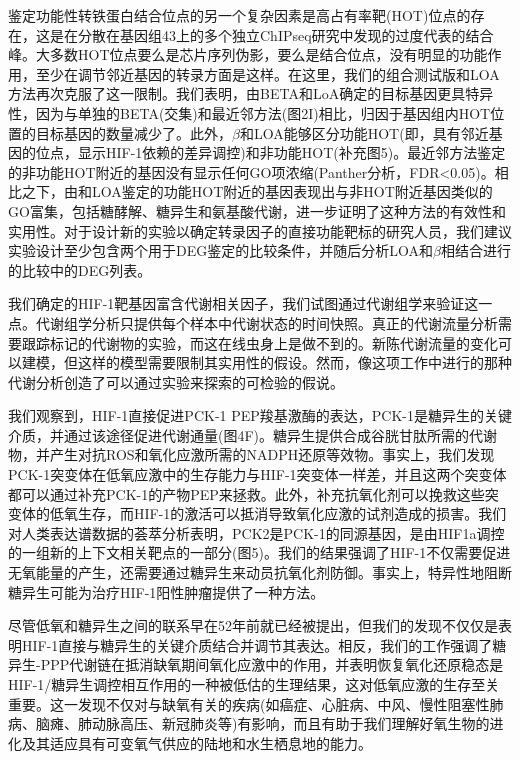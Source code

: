 \documentclass{ctexart}
\begin{document}
        鉴定功能性转铁蛋白结合位点的另一个复杂因素是高占有率靶(HOT)位点的存在，这是在分散在基因组43上的多个独立ChIPseq研究中发现的过度代表的结合峰。大多数HOT位点要么是芯片序列伪影，要么是结合位点，没有明显的功能作用，至少在调节邻近基因的转录方面是这样。在这里，我们的组合测试版和LOA方法再次克服了这一限制。我们表明，由BETA和LoA确定的目标基因更具特异性，因为与单独的BETA(交集)和最近邻方法(图2I)相比，归因于基因组内HOT位置的目标基因的数量减少了。此外，$\beta$和LOA能够区分功能HOT(即，具有邻近基因的位点，显示HIF-1依赖的差异调控)和非功能HOT(补充图5)。最近邻方法鉴定的非功能HOT附近的基因没有显示任何GO项浓缩(Panther分析，FDR<0.05)。相比之下，由和LOA鉴定的功能HOT附近的基因表现出与非HOT附近基因类似的GO富集，包括糖酵解、糖异生和氨基酸代谢，进一步证明了这种方法的有效性和实用性。对于设计新的实验以确定转录因子的直接功能靶标的研究人员，我们建议实验设计至少包含两个用于DEG鉴定的比较条件，并随后分析LOA和$\beta$相结合进行的比较中的DEG列表。

        我们确定的HIF-1靶基因富含代谢相关因子，我们试图通过代谢组学来验证这一点。代谢组学分析只提供每个样本中代谢状态的时间快照。真正的代谢流量分析需要跟踪标记的代谢物的实验，而这在线虫身上是做不到的。新陈代谢流量的变化可以建模，但这样的模型需要限制其实用性的假设。然而，像这项工作中进行的那种代谢分析创造了可以通过实验来探索的可检验的假说。

        我们观察到，HIF-1直接促进PCK-1 PEP羧基激酶的表达，PCK-1是糖异生的关键介质，并通过该途径促进代谢通量(图4F)。糖异生提供合成谷胱甘肽所需的代谢物，并产生对抗ROS和氧化应激所需的NADPH还原等效物。事实上，我们发现PCK-1突变体在低氧应激中的生存能力与HIF-1突变体一样差，并且这两个突变体都可以通过补充PCK-1的产物PEP来拯救。此外，补充抗氧化剂可以挽救这些突变体的低氧生存，而HIF-1的激活可以抵消导致氧化应激的试剂造成的损害。我们对人类表达谱数据的荟萃分析表明，PCK2是PCK-1的同源基因，是由HIF1a调控的一组新的上下文相关靶点的一部分(图5)。我们的结果强调了HIF-1不仅需要促进无氧能量的产生，还需要通过糖异生来动员抗氧化剂防御。事实上，特异性地阻断糖异生可能为治疗HIF-1阳性肿瘤提供了一种方法。

        尽管低氧和糖异生之间的联系早在52年前就已经被提出，但我们的发现不仅仅是表明HIF-1直接与糖异生的关键介质结合并调节其表达。相反，我们的工作强调了糖异生-PPP代谢链在抵消缺氧期间氧化应激中的作用，并表明恢复氧化还原稳态是HIF-1/糖异生调控相互作用的一种被低估的生理结果，这对低氧应激的生存至关重要。这一发现不仅对与缺氧有关的疾病(如癌症、心脏病、中风、慢性阻塞性肺病、脑瘫、肺动脉高压、新冠肺炎等)有影响，而且有助于我们理解好氧生物的进化及其适应具有可变氧气供应的陆地和水生栖息地的能力。
\end{document}
